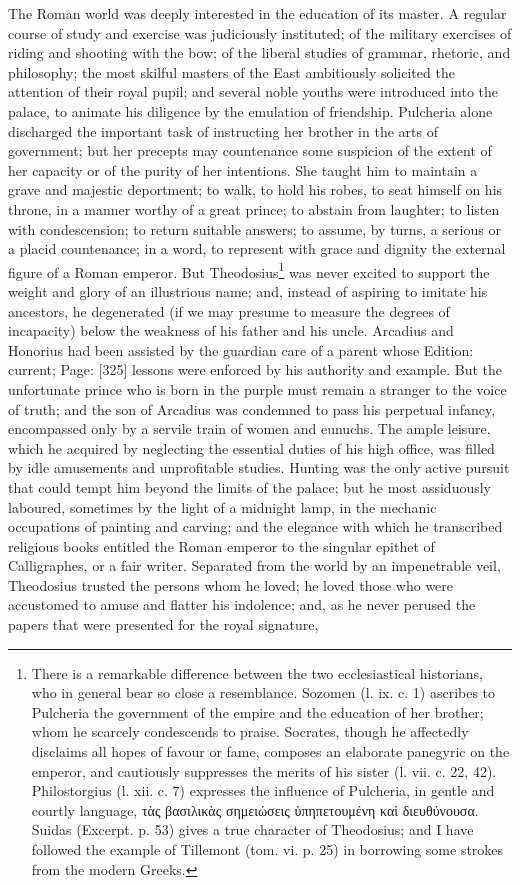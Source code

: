 The Roman world was deeply interested in the education of its master. A regular course of study and exercise was judiciously instituted; of the military exercises of riding and shooting with the bow; of the liberal studies of grammar, rhetoric, and philosophy; the most skilful masters of the East ambitiously solicited the attention of their royal pupil; and several noble youths were introduced into the palace, to animate his diligence by the emulation of friendship. Pulcheria alone discharged the important task of instructing her brother in the arts of government; but her precepts may countenance some suspicion of the extent of her capacity or of the purity of her intentions. She taught him to maintain a grave and majestic deportment; to walk, to hold his robes, to seat himself on his throne, in a manner worthy of a great prince; to abstain from laughter; to listen with condescension; to return suitable answers; to assume, by turns, a serious or a placid countenance; in a word, to represent with grace and dignity the external figure of a Roman emperor. But Theodosius\footnote{There is a remarkable difference between the two ecclesiastical historians, who in general bear so close a resemblance. Sozomen (l. ix. c. 1) ascribes to Pulcheria the government of the empire and the education of her brother; whom he scarcely condescends to praise. Socrates, though he affectedly disclaims all hopes of favour or fame, composes an elaborate panegyric on the emperor, and cautiously suppresses the merits of his sister (l. vii. c. 22, 42). Philostorgius (l. xii. c. 7) expresses the influence of Pulcheria, in gentle and courtly language, \textgreek{τ\texthebrew{ὰ}ς βασιλικ\texthebrew{ὰ}ς σημειώσεις \texthebrew{ὑ}πηπετουμένη κα\texthebrew{ὶ} διευθύνουσα}. Suidas (Excerpt. p. 53) gives a true character of Theodosius; and I have followed the example of Tillemont (tom. vi. p. 25) in borrowing some strokes from the modern Greeks.} was never excited to support the weight and glory of an illustrious name; and, instead of aspiring to imitate his ancestors, he degenerated (if we may presume to measure the degrees of incapacity) below the weakness of his father and his uncle. Arcadius and Honorius had been assisted by the guardian care of a parent whose Edition: current; Page: [325] lessons were enforced by his authority and example. But the unfortunate prince who is born in the purple must remain a stranger to the voice of truth; and the son of Arcadius was condemned to pass his perpetual infancy, encompassed only by a servile train of women and eunuchs. The ample leisure, which he acquired by neglecting the essential duties of his high office, was filled by idle amusements and unprofitable studies. Hunting was the only active pursuit that could tempt him beyond the limits of the palace; but he most assiduously laboured, sometimes by the light of a midnight lamp, in the mechanic occupations of painting and carving; and the elegance with which he transcribed religious books entitled the Roman emperor to the singular epithet of Calligraphes, or a fair writer. Separated from the world by an impenetrable veil, Theodosius trusted the persons whom he loved; he loved those who were accustomed to amuse and flatter his indolence; and, as he never perused the papers that were presented for the royal signature, 